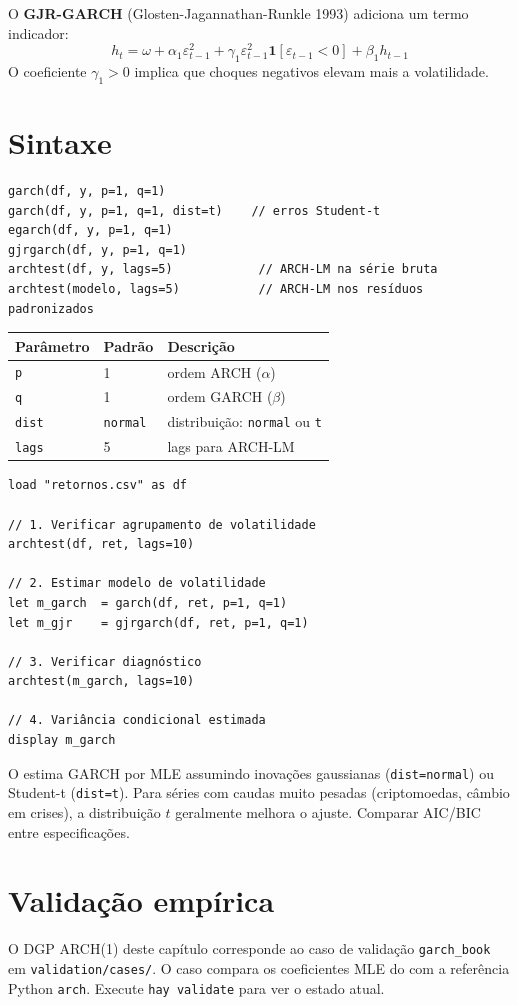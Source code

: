O \textbf{GJR-GARCH} (Glosten-Jagannathan-Runkle 1993) adiciona um termo
indicador:
\[
  h_t = \omega + \alpha_1 \varepsilon_{t-1}^2
        + \gamma_1 \varepsilon_{t-1}^2 \mathbf{1}[\varepsilon_{t-1} < 0]
        + \beta_1 h_{t-1}
\]
O coeficiente $\gamma_1 > 0$ implica que choques negativos elevam mais a
volatilidade.

\section{Sintaxe}

\begin{lstlisting}
garch(df, y, p=1, q=1)
garch(df, y, p=1, q=1, dist=t)    // erros Student-t
egarch(df, y, p=1, q=1)
gjrgarch(df, y, p=1, q=1)
archtest(df, y, lags=5)            // ARCH-LM na série bruta
archtest(modelo, lags=5)           // ARCH-LM nos resíduos padronizados
\end{lstlisting}

\begin{center}
\begin{tabular}{lll}
\toprule
\textbf{Parâmetro} & \textbf{Padrão} & \textbf{Descrição} \\
\midrule
\texttt{p}    & 1                & ordem ARCH ($\alpha$) \\
\texttt{q}    & 1                & ordem GARCH ($\beta$) \\
\texttt{dist} & \texttt{normal}  & distribuição: \texttt{normal} ou \texttt{t} \\
\texttt{lags} & 5                & lags para ARCH-LM \\
\bottomrule
\end{tabular}
\end{center}

\begin{lstlisting}[caption={Fluxo típico — retornos de ativos}]
load "retornos.csv" as df

// 1. Verificar agrupamento de volatilidade
archtest(df, ret, lags=10)

// 2. Estimar modelo de volatilidade
let m_garch  = garch(df, ret, p=1, q=1)
let m_gjr    = gjrgarch(df, ret, p=1, q=1)

// 3. Verificar diagnóstico
archtest(m_garch, lags=10)

// 4. Variância condicional estimada
display m_garch
\end{lstlisting}

\begin{nota}
  O \hayashi{} estima GARCH por MLE assumindo inovações gaussianas
  (\lstinline{dist=normal}) ou Student-t (\lstinline{dist=t}). Para séries
  com caudas muito pesadas (criptomoedas, câmbio em crises), a distribuição
  $t$ geralmente melhora o ajuste. Comparar AIC/BIC entre especificações.
\end{nota}

\section{Validação empírica}

O DGP ARCH(1) deste capítulo corresponde ao caso de validação
\texttt{garch_book} em \texttt{validation/cases/}. O caso compara os
coeficientes MLE do \hayashi{} com a referência Python \texttt{arch}. Execute
\lstinline{hay validate} para ver o estado atual.
